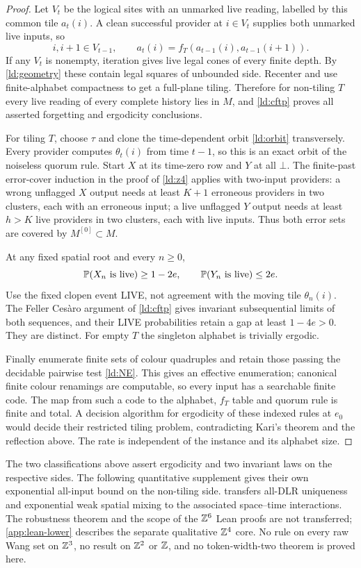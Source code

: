 \begin{proof}
Let $V_t$ be the logical sites with an unmarked live reading, labelled by this common tile $a_t(i)$. A clean successful provider at $i\in V_t$ supplies both unmarked live inputs, so
\[
 i,i+1\in V_{t-1},\qquad
 a_t(i)=f_T(a_{t-1}(i),a_{t-1}(i+1)).
\]
If any $V_t$ is nonempty, iteration gives live legal cones of every finite depth. By \cref{ld:geometry} these contain legal squares of unbounded side. Recenter and use finite-alphabet compactness to get a full-plane tiling. Therefore for non-tiling $T$ every live reading of every complete history lies in $M$, and \cref{ld:cftp} proves all asserted forgetting and ergodicity conclusions.

For tiling $T$, choose $\tau$ and clone the time-dependent orbit \eqref{ld:orbit} transversely. Every provider computes $\theta_t(i)$ from time $t-1$, so this is an exact orbit of the noiseless quorum rule. Start $X$ at its time-zero row and $Y$ at all $\bot$. The finite-past error-cover induction in the proof of \cref{ld:z4} applies with two-input providers: a wrong unflagged $X$ output needs at least $K+1$ erroneous providers in two clusters, each with an erroneous input; a live unflagged $Y$ output needs at least $h>K$ live providers in two clusters, each with live inputs. Thus both error sets are covered by $M^{[0]}\subset M$.

At any fixed spatial root and every $n\ge0$,
\[
 \mathbb{P}(X_n\text{ is live})\ge1-2e,\qquad
 \mathbb{P}(Y_n\text{ is live})\le2e.
\]
Use the fixed clopen event LIVE, not agreement with the moving tile $\theta_n(i)$. The Feller Ces\`aro argument of \cref{ld:cftp} gives invariant subsequential limits of both sequences, and their LIVE probabilities retain a gap at least $1-4e>0$. They are distinct. For empty $T$ the singleton alphabet is trivially ergodic.

Finally enumerate finite sets of colour quadruples and retain those passing the decidable pairwise test \eqref{ld:NE}. This gives an effective enumeration; canonical finite colour renamings are computable, so every input has a searchable finite code. The map from such a code to the alphabet, $f_T$ table and quorum rule is finite and total. A decision algorithm for ergodicity of these indexed rules at $e_0$ would decide their restricted tiling problem, contradicting Kari's theorem and the reflection above. The rate is independent of the instance and its alphabet size.
\end{proof}

The two classifications above assert ergodicity and two invariant laws on the respective sides. The following quantitative supplement gives their own exponential all-input bound on the non-tiling side.  transfers all-DLR uniqueness and exponential weak spatial mixing to the associated space--time interactions. The robustness theorem and the scope of the $\mathbb{Z}^6$ Lean proofs are not transferred; \cref{app:lean-lower} describes the separate qualitative $\mathbb{Z}^4$ core. No rule on every raw Wang set on $\mathbb{Z}^3$, no result on $\mathbb{Z}^2$ or $\mathbb{Z}$, and no token-width-two theorem is proved here.




